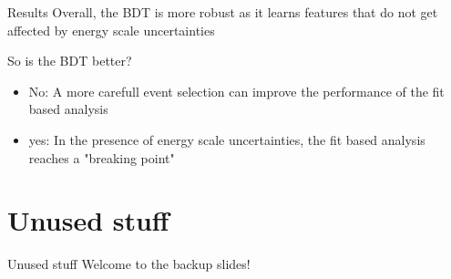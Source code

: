 \documentclass[bigger]{beamer}
\begin{document}
\begin{frame}[label={sec:orgb49d4c9}]{Results}
Overall, the BDT is more robust as it learns features that do not get affected by energy scale uncertainties\newline

\alert{So is the BDT better?}
\begin{itemize}
\item No: A more carefull event selection can improve the performance of the fit based analysis
\item yes: In the presence of energy scale uncertainties, the fit based analysis reaches a "breaking point"
\end{itemize}
\end{frame}

\section{Unused stuff}
\label{sec:org2679490}
\begin{frame}[label={sec:orgba67c2a}]{Unused stuff}
\alert{Welcome to the backup slides!}
\end{frame}
\end{document}
